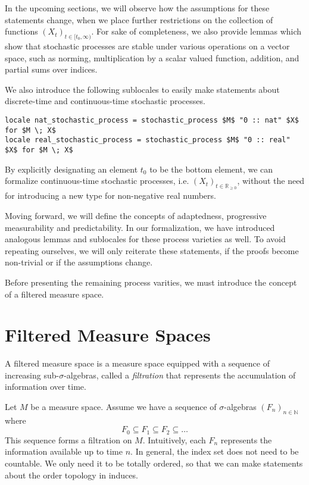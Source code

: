 In the upcoming sections, we will observe how the assumptions for these statements change, when we place further restrictions on the collection of functions $(X_t)_{t \in [t_0,\infty)}$. For sake of completeness, we also provide lemmas which show that stochastic processes are stable under various operations on a vector space, such as norming, multiplication by a scalar valued function, addition, and partial sums over indices.

We also introduce the following sublocales to easily make statements about discrete-time and continuous-time stochastic processes.

\begin{isadefinition}
{\small
\begin{lstlisting}[style=isabelle]
locale nat_stochastic_process = stochastic_process $M$ "0 :: nat" $X$ for $M \; X$
locale real_stochastic_process = stochastic_process $M$ "0 :: real" $X$ for $M \; X$
\end{lstlisting}
}
\end{isadefinition}

By explicitly designating an element $t_0$ to be the bottom element, we can formalize continuous-time stochastic processes, i.e. $(X_t)_{t \in \mathbb{R}_{\ge 0}}$, without the need for introducing a new type for non-negative real numbers. 

\begin{remark}
Moving forward, we will define the concepts of adaptedness, progressive measurability and predictability. In our formalization, we have introduced analogous lemmas and sublocales for these process varieties as well. To avoid repeating ourselves, we will only reiterate these statements, if the proofs become non-trivial or if the assumptions change.
\end{remark}

Before presenting the remaining process varities, we must introduce the concept of a filtered measure space.

\section{Filtered Measure Spaces}

A filtered measure space is a measure space equipped with a sequence of increasing sub-$\sigma$-algebras, called a \textit{filtration} that represents the accumulation of information over time.

Let $M$ be a measure space. Assume we have a sequence of $\sigma$-algebras $(F_n)_{n \in \mathbb{N}}$ where 
\[
	F_0 \subseteq F_1 \subseteq F_2 \subseteq \dots
\]
This sequence forms a filtration on $M$. Intuitively, each $F_n$ represents the information available up to time $n$. In general, the index set does not need to be countable. We only need it to be totally ordered, so that we can make statements about the order topology in induces. 

